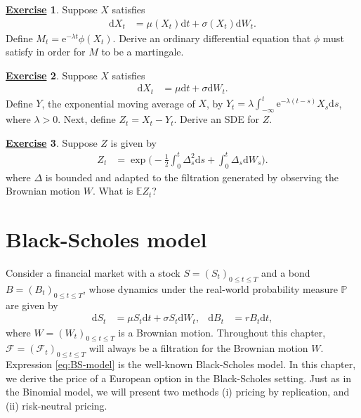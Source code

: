 \documentclass[12pt]{book}
\numberwithin{equation}{chapter}
\theoremstyle{plain}
\numberwithin{theorem}{section}
\theoremstyle{definition}
\newtheorem{exercise}{\underline{Exercise}}
\numberwithin{exercise}{chapter}
\newcommand{\<}{\langle}
\renewcommand{\>}{\rangle}
\renewcommand{\(}{\left(}
\renewcommand{\)}{\right)}
\renewcommand{\[}{\left[}
\renewcommand{\]}{\right]}
\newcommand\Eb{\mathds{E}}
\newcommand\Pb{\mathds{P}}
\newcommand\Fc{\mathscr{F}}
\newcommand\sig{\sigma}
\newcommand\lam{\lambda}
\newcommand\Del{\Delta}
\newcommand\dd{\mathrm{d}}
\newcommand\ee{\mathrm{e}}
\theoremstyle{definition}
\numberwithin{question}{section}
\begin{document}
\begin{exercise}
\label{exer:4-5}
Suppose $X$ satisfies
\begin{align}
\dd X_t
	&=	\mu(X_t) \dd t + \sig(X_t) \dd W_t .
\end{align}
Define $M_t = \ee^{- \lam t} \phi(X_t)$.  Derive an ordinary differential equation that $\phi$ must satisfy in order for $M$ to be a martingale.
\end{exercise}


\begin{exercise}
\label{exer:4-6}
Suppose $X$ satisfies
\begin{align}
\dd X_t
	&=	\mu \dd t + \sig \dd W_t .
\end{align}
Define $Y$, the exponential moving average of $X$, by $Y_t = \lam \int_{-\infty }^t \ee^{-\lam(t-s)} X_s \dd s$, where $\lam > 0$.  Next, define $Z_t = X_t - Y_t$.  Derive an SDE for $Z$.
\end{exercise}


\begin{exercise}
\label{exer:4-7}
Suppose $Z$ is given by
\begin{align}
Z_t
	&=	\exp \Big( - \tfrac{1}{2}\int_0^t \Del_s^2 \dd s + \int_0^t \Del_s \dd W_s \Big) .
\end{align}
where $\Del$ is bounded and adapted to the filtration generated by observing the Brownian motion $W$.  What is $\Eb Z_t$?
\end{exercise}






\chapter{Black-Scholes model}

Consider a financial market with a stock $S = (S_t)_{0 \leq t \leq T}$ and a bond $B = (B_t)_{0 \leq t \leq T}$, whose dynamics under the real-world probability measure $\Pb$ are given by
\begin{align}
\dd S_t 
	&= \mu S_t \dd t + \sigma S_t \dd W_t , &
\dd B_t 
	&= r B_t \dd t ,  \label{eq:BS-model}
\end{align}
where $W = (W_t)_{0 \leq t \leq T}$ is a Brownian motion.  Throughout this chapter, $\Fc = (\Fc_t)_{0 \leq t \leq T}$ will always be a filtration for the Brownian motion $W$.  Expression \eqref{eq:BS-model} is the well-known Black-Scholes model.  In this chapter, we derive the price of a European option in the Black-Scholes setting.  Just as in the Binomial model, we will present two methods (i) pricing by replication, and (ii) risk-neutral pricing.
\end{document}
